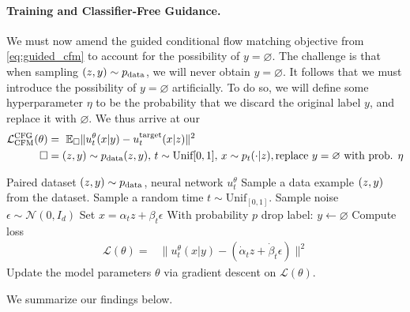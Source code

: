\paragraph{Training and Classifier-Free Guidance.} We must now amend the guided conditional flow matching objective from \cref{eq:guided_cfm} to account for the possibility of $y = \varnothing$. The challenge is that when sampling $(z,y) \sim p_{\rm{data}}$, we will never obtain $y = \varnothing$. It follows that we must introduce the possibility of $y = \varnothing$ artificially. To do so, we will define some hyperparameter $\eta$ to be the probability that we discard the original label $y$, and replace it with $\varnothing$. We thus arrive at our 
\begin{align}
    \mathcal{L}_{\text{CFM}}^{\text{CFG}}(\theta) &= \,\,\mathbb{E}_{\square} \lVert u_t^{\theta}(x|y) - u^{\text{target}}_t(x|z)\rVert^2\\
    \square &= (z,y) \sim p_{\text{data}}(z,y),\, t \sim \text{Unif}[0,1],\, x \sim p_t(\cdot|z),\text{replace }y=\varnothing\text{ with prob. }\eta
\end{align}


\begin{algorithm}[h]
\caption{Classifier-free guidance training for Gaussian probability path $p_t(x|z)=\mathcal{N}(x;\alpha_tz,\beta_t^2I_d)$}
\label{alg:cfg_training}
\begin{algorithmic}[1]
\REQUIRE Paired dataset $(z,y)\sim p_{\rm{data}}$, neural network $u_t^\theta$
    \STATE Sample a data example $(z,y)$ from the dataset.
    \STATE Sample a random time $t \sim \text{Unif}_{[0,1]}$.
    \STATE Sample noise $\epsilon\sim\mathcal{N}(0,I_d)$
    \STATE Set $x=\alpha_t z + \beta_t \epsilon$
    \STATE With probability $p$ drop label: $y\leftarrow \varnothing$
    \STATE Compute loss
    \begin{align*}
        \mathcal{L}(\theta) =& \|u_t^\theta(x|y)-(\dot{\alpha}_tz+\dot{\beta}_t\epsilon)\|^2 
    \end{align*}
    \STATE Update the model parameters $\theta$ via gradient descent on $\mathcal{L}(\theta)$.
\ENDFOR
\end{algorithmic}
\end{algorithm}

We summarize our findings below.

